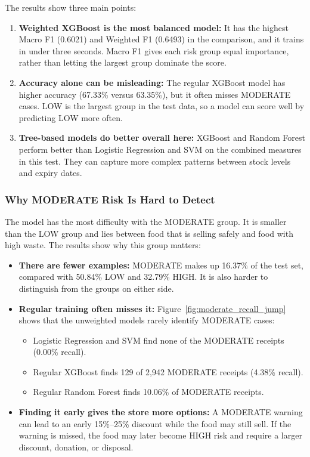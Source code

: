 \documentclass[12pt,a4paper]{article}
\renewcommand{\_}{\oldunderscore\allowbreak}
\begin{document}
The results show three main points:
\begin{enumerate}[leftmargin=18pt, itemsep=2pt]
    \item \textbf{Weighted XGBoost is the most balanced model:} It has the highest Macro F1 (0.6021) and Weighted F1 (0.6493) in the comparison, and it trains in under three seconds. Macro F1 gives each risk group equal importance, rather than letting the largest group dominate the score.
    \item \textbf{Accuracy alone can be misleading:} The regular XGBoost model has higher accuracy (67.33\% versus 63.35\%), but it often misses MODERATE cases. LOW is the largest group in the test data, so a model can score well by predicting LOW more often.
    \item \textbf{Tree-based models do better overall here:} XGBoost and Random Forest perform better than Logistic Regression and SVM on the combined measures in this test. They can capture more complex patterns between stock levels and expiry dates.
\end{enumerate}

\subsubsection{Why MODERATE Risk Is Hard to Detect}
\label{sec:moderate_jump}

The model has the most difficulty with the MODERATE group. It is smaller than the LOW group and lies between food that is selling safely and food with high waste. The results show why this group matters:
\begin{itemize}[leftmargin=18pt, itemsep=2pt]
    \item \textbf{There are fewer examples:} MODERATE makes up 16.37\% of the test set, compared with 50.84\% LOW and 32.79\% HIGH. It is also harder to distinguish from the groups on either side.
    \item \textbf{Regular training often misses it:} Figure~\ref{fig:moderate_recall_jump} shows that the unweighted models rarely identify MODERATE cases:
    \begin{itemize}
        \item Logistic Regression and SVM find none of the MODERATE receipts (0.00\% recall).
        \item Regular XGBoost finds 129 of 2,942 MODERATE receipts (4.38\% recall).
        \item Regular Random Forest finds 10.06\% of MODERATE receipts.
    \end{itemize}
    \item \textbf{Finding it early gives the store more options:} A MODERATE warning can lead to an early 15\%--25\% discount while the food may still sell. If the warning is missed, the food may later become HIGH risk and require a larger discount, donation, or disposal.
\end{itemize}
\end{document}
